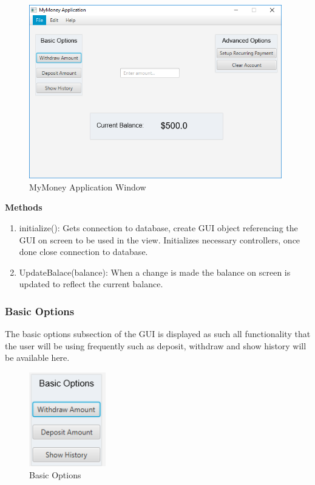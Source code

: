 \documentclass[12pt]{article}
\begin{document}
\begin{figure}[h!]
  \centering
  \includegraphics[width=110mm]{app_window.png}
  \caption{MyMoney Application Window}
\end{figure}

\textbf{Methods}\\
\vspace*{-0.2in}
\begin{enumerate}
  \item initialize(): Gets connection to database, create GUI object referencing the GUI on screen to be used in the view. Initializes necessary controllers, once done close connection to database.
  \item UpdateBalace(balance): When a change is made the balance on screen is updated to reflect the current balance.
\end{enumerate}

\subsubsection{Basic Options}
The basic options subsection of the GUI is displayed as such all functionality that the user will be using frequently such as deposit, withdraw and show history will be available here.\\

\begin{figure}[h!]
  \centering
  \includegraphics[]{basic_options.png}
  \caption{Basic Options}
\end{figure}
\end{document}
